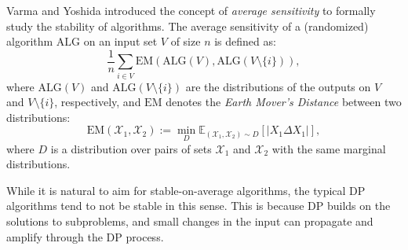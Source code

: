 \documentclass[preprint, 11pt]{article}
\begin{document}
Varma and Yoshida \cite{VarmaYoshida} introduced the concept of \emph{average sensitivity} to formally study the stability of algorithms. The average sensitivity of a (randomized) algorithm $\text{ALG}$ on an input set $V$ of size $n$ is defined as:
\[
\frac{1}{n} \sum_{i \in V} \text{EM}(\text{ALG}(V), \text{ALG}(V \setminus \{i\})),
\]
where $\text{ALG}(V)$ and $\text{ALG}(V \setminus \{i\})$ are the distributions of the outputs on $V$ and $V \setminus \{i\}$, respectively, and $\text{EM}$ denotes the \emph{Earth Mover's Distance} between two distributions:
\[
\text{EM}(\mathcal{X}_1, \mathcal{X}_2) := \min_{D} \mathbb{E}_{(\mathcal{X}_1, \mathcal{X}_2) \sim D} [|X_1 \Delta X_1|],
\]
where $D$ is a distribution over pairs of sets $\mathcal{X}_1$ and $\mathcal{X}_2$ with the same marginal distributions.

While it is natural to aim for stable-on-average algorithms, the typical DP algorithms tend to not be stable in this sense. This is because DP builds on the solutions to subproblems, and small changes in the input can propagate and amplify through the DP process.
\end{document}
